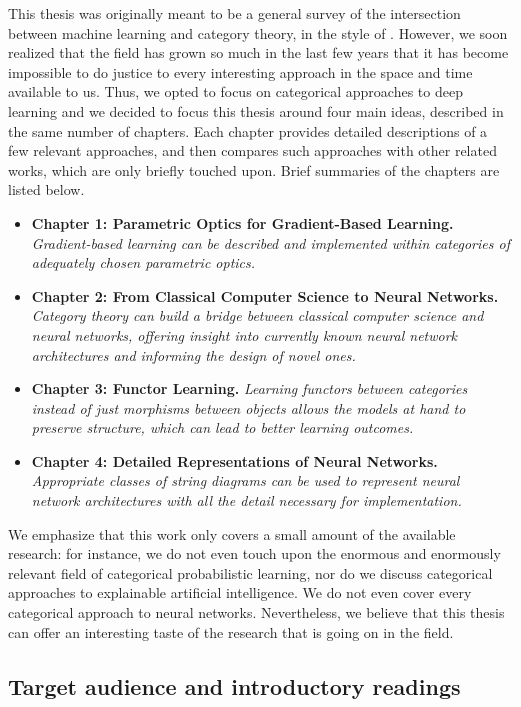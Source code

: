 \documentclass[11pt,a4paper,openright,twoside]{report}
\theoremstyle{plain}
\theoremstyle{definition}
\begin{document}
This thesis was originally meant to be a general survey of the intersection between machine learning and category theory, in the style of \cite{shiebler2021category}. However, we soon realized that the field has grown so much in the last few years that it has become impossible to do justice to every interesting approach in the space and time available to us. Thus, we opted to focus on categorical approaches to deep learning and we decided to focus this thesis around four main ideas, described in the same number of chapters. Each chapter provides detailed descriptions of a few relevant approaches, and then compares such approaches with other related works, which are only briefly touched upon. Brief summaries of the chapters are listed below.

\begin{itemize}
  \item \textbf{Chapter 1: Parametric Optics for Gradient-Based Learning.} \textit{Gradient-based learning can be described and implemented within categories of adequately chosen parametric optics.}
  \item \textbf{Chapter 2: From Classical Computer Science to Neural Networks.} \textit{Category theory can build a bridge between classical computer science and neural networks, offering insight into currently known neural network architectures and informing the design of novel ones.}
  \item \textbf{Chapter 3: Functor Learning.} \textit{Learning functors between categories instead of just morphisms between objects allows the models at hand to preserve structure, which can lead to better learning outcomes.}
  \item \textbf{Chapter 4: Detailed Representations of Neural Networks.} \textit{Appropriate classes of string diagrams can be used to represent neural network architectures with all the detail necessary for implementation.}
\end{itemize}

We emphasize that this work only covers a small amount of the available research: for instance, we do not even touch upon the enormous and enormously relevant field of categorical probabilistic learning, nor do we discuss categorical approaches to explainable artificial intelligence. We do not even cover every categorical approach to neural networks. Nevertheless, we believe that this thesis can offer an interesting taste of the research that is going on in the field.

\subsection*{Target audience and introductory readings}
\end{document}
